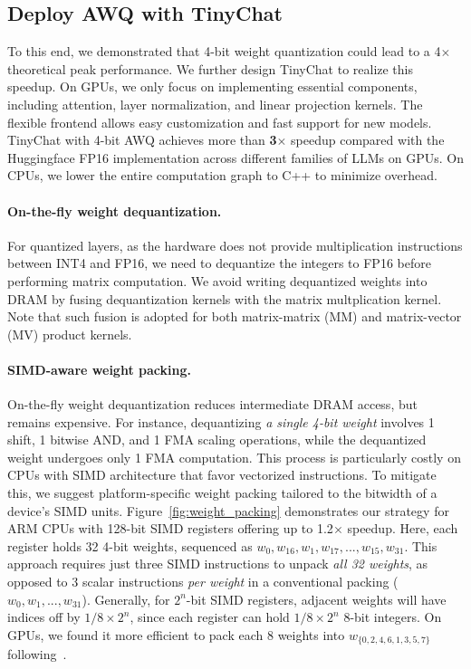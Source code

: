 \subsection{Deploy AWQ with TinyChat}

To this end, we demonstrated that 4-bit weight quantization could lead to a 4$\times$ theoretical peak performance. We further design TinyChat to realize this speedup. On GPUs, we only focus on implementing essential components, including attention, layer normalization, and linear projection kernels. The flexible frontend allows easy customization and fast support for new models. TinyChat with 4-bit AWQ achieves more than \textbf{3$\times$} speedup compared with the Huggingface FP16 implementation across different families of LLMs on GPUs. On CPUs, we lower the entire computation graph to C++ to minimize overhead.

\paragraph{On-the-fly weight dequantization.} For quantized layers, as the hardware does not provide multiplication instructions between INT4 and FP16, we need to dequantize the integers to FP16 before performing matrix computation. We avoid writing dequantized weights into DRAM by fusing dequantization kernels with the matrix multplication kernel. Note that such fusion is adopted for both matrix-matrix (MM) and matrix-vector (MV) product kernels. 

\paragraph{SIMD-aware weight packing.} On-the-fly weight dequantization reduces intermediate DRAM access, but remains expensive. For instance, dequantizing \textit{a single 4-bit weight} involves 1 shift, 1 bitwise AND, and 1 FMA scaling operations, while the dequantized weight undergoes only 1 FMA computation. This process is particularly costly on CPUs with SIMD architecture that favor vectorized instructions. To mitigate this, we suggest platform-specific weight packing tailored to the bitwidth of a device's SIMD units. Figure~\ref{fig:weight_packing} demonstrates our strategy for ARM CPUs with 128-bit SIMD registers offering up to 1.2$\times$ speedup. Here, each register holds 32 4-bit weights, sequenced as $w_0, w_{16}, w_{1}, w_{17}, ..., w_{15}, w_{31}$. This approach requires just three SIMD instructions to unpack \textit{all 32 weights}, as opposed to 3 scalar instructions \textit{per weight} in a conventional packing ($w_0, w_1, ..., w_{31}$). Generally, for $2^n$-bit SIMD registers, adjacent weights will have indices off by $1/8\times2^n$, since each register can hold $1/8\times2^n$ 8-bit integers. On GPUs, we found it more efficient to pack each 8 weights into $w_{\{0,2,4,6,1,3,5,7\}}$ following~\cite{kim2022says}. 

